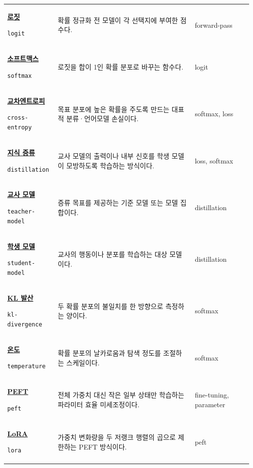\begin{longtable}{p{} p{} p{}}
\hypertarget{glossary:logit}{\hyperref[bg:logit]{\textbf{로짓}}} \newline\texttt{logit} & 확률 정규화 전 모델이 각 선택지에 부여한 점수다. & \scriptsize forward-pass \\
\hypertarget{glossary:softmax}{\hyperref[bg:softmax]{\textbf{소프트맥스}}} \newline\texttt{softmax} & 로짓을 합이 1인 확률 분포로 바꾸는 함수다. & \scriptsize logit \\
\hypertarget{glossary:cross-entropy}{\hyperref[bg:cross-entropy]{\textbf{교차엔트로피}}} \newline\texttt{cross-entropy} & 목표 분포에 높은 확률을 주도록 만드는 대표적 분류·언어모델 손실이다. & \scriptsize softmax, loss \\
\hypertarget{glossary:distillation}{\hyperref[bg:distillation]{\textbf{지식 증류}}} \newline\texttt{distillation} & 교사 모델의 출력이나 내부 신호를 학생 모델이 모방하도록 학습하는 방식이다. & \scriptsize loss, softmax \\
\hypertarget{glossary:teacher-model}{\hyperref[bg:teacher-model]{\textbf{교사 모델}}} \newline\texttt{teacher-model} & 증류 목표를 제공하는 기준 모델 또는 모델 집합이다. & \scriptsize distillation \\
\hypertarget{glossary:student-model}{\hyperref[bg:student-model]{\textbf{학생 모델}}} \newline\texttt{student-model} & 교사의 행동이나 분포를 학습하는 대상 모델이다. & \scriptsize distillation \\
\hypertarget{glossary:kl-divergence}{\hyperref[bg:kl-divergence]{\textbf{KL 발산}}} \newline\texttt{kl-divergence} & 두 확률 분포의 불일치를 한 방향으로 측정하는 양이다. & \scriptsize softmax \\
\hypertarget{glossary:temperature}{\hyperref[bg:temperature]{\textbf{온도}}} \newline\texttt{temperature} & 확률 분포의 날카로움과 탐색 정도를 조절하는 스케일이다. & \scriptsize softmax \\
\hypertarget{glossary:peft}{\hyperref[bg:peft]{\textbf{PEFT}}} \newline\texttt{peft} & 전체 가중치 대신 작은 일부 상태만 학습하는 파라미터 효율 미세조정이다. & \scriptsize fine-tuning, parameter \\
\hypertarget{glossary:lora}{\hyperref[bg:lora]{\textbf{LoRA}}} \newline\texttt{lora} & 가중치 변화량을 두 저랭크 행렬의 곱으로 제한하는 PEFT 방식이다. & \scriptsize peft \\

\end{longtable}
